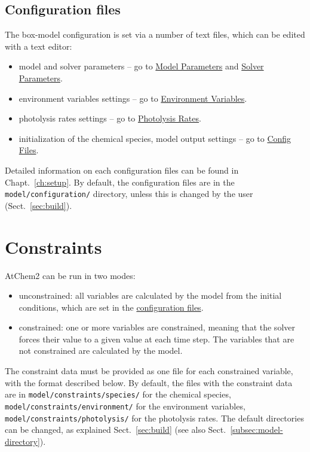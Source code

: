 \subsection{Configuration files} \label{subsec:configuration-files}

The box-model configuration is set via a number of text files,
which can be edited with a text editor: 

\begin{itemize}
\item model and solver parameters -- go to
  \hyperref[sec:model-parameters]{Model Parameters} and
  \hyperref[sec:solver-parameters]{Solver Parameters}.
\item environment variables settings -- go to
  \hyperref[sec:environment-variables]{Environment Variables}.
\item photolysis rates settings -- go to
  \hyperref[sec:photolysis-rates]{Photolysis Rates}.
\item initialization of the chemical species, model output settings -- go
  to \hyperref[sec:config-files]{Config Files}.
\end{itemize}

Detailed information on each configuration files can be found in
Chapt.~\ref{ch:setup}. By default, the configuration files are in the
\texttt{model/configuration/} directory, unless this is changed by the
user (Sect.~\ref{sec:build}).

\section{Constraints} \label{sec:constraints}

AtChem2 can be run in two modes:

\begin{itemize}
\item unconstrained: all variables are calculated by the model from
  the initial conditions, which are set in the
  \hyperref[subsec:configuration-files]{configuration files}.
\item constrained: one or more variables are constrained, meaning that
  the solver forces their value to a given value at each time
  step. The variables that are not constrained are calculated by the
  model.
\end{itemize}

The constraint data  must be provided as one file for each
constrained variable, with the format described below. By default, the
files with the constraint data are in \texttt{model/constraints/species/}
for the chemical species, \texttt{model/constraints/environment/} for
the environment variables, \texttt{model/constraints/photolysis/}
for the photolysis rates. The default directories can be changed, as
explained Sect.~\ref{sec:build} (see also Sect.~\ref{subsec:model-directory}).

